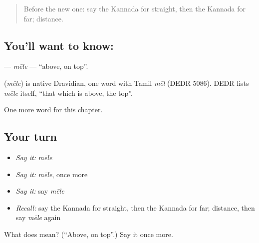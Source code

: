 \label{lesson:KA-C107-mele}



\begin{quote}
Before the new one: say the Kannada for straight, then the Kannada for far; distance.
\end{quote}

\subsection*{You'll want to know: }
\textbf{} — \emph{mēle} — \textquotedblleft{}above, on top\textquotedblright{}.

\begin{cousinweb}
\textbf{} (\emph{mēle}) is native Dravidian, one word with Tamil \emph{mēl} (DEDR 5086). DEDR lists \emph{mēle} itself, \textquotedblleft{}that which is above, the top\textquotedblright{}.
\end{cousinweb}

\begin{grammarlens}[title={What you've built}]
One more word for this chapter.
\end{grammarlens}

\subsection*{Your turn}
\begin{itemize}
\raggedright
  \item \emph{Say it:} \emph{mēle}
  \item \emph{Say it:} \emph{mēle}, once more
  \item \emph{Say it:} say \emph{mēle}
  \item \emph{Recall:} say the Kannada for straight, then the Kannada for far; distance, then say \emph{mēle} again
\end{itemize}

\begin{tcolorbox}[breakable,colback=teal!4,colframe=teal!35!black,title={Before you move on}]
What does  mean? (\textquotedblleft{}Above, on top\textquotedblright{}.) Say it once more.
\end{tcolorbox}

